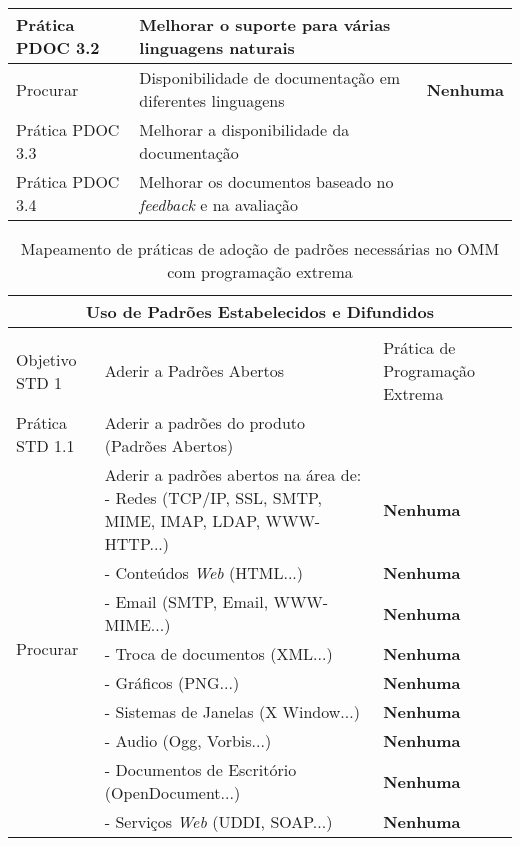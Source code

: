 \begin{longtable}{|p{2cm}|p{7cm}|p{7cm}|}
  \hline \cellcolor[gray]{0.9} Prática PDOC 3.2 &
  \cellcolor[gray]{0.9}
  Melhorar o suporte para várias linguagens naturais & \\
  \hline \multirow{1}{*}{Procurar} & Disponibilidade de documentação
  em diferentes linguagens &
  \textbf{Nenhuma} \\
  \hline \cellcolor[gray]{0.9} Prática PDOC 3.3 &
  \cellcolor[gray]{0.9}
  Melhorar a disponibilidade da documentação & \\
  \hline \cellcolor[gray]{0.9} Prática PDOC 3.4 &
  \cellcolor[gray]{0.9} Melhorar os documentos baseado no
  \textit{feedback} e na avaliação
  &   \label{tab:xp-to-omm} \\
  \hline
\end{longtable}

\begin{longtable}{|p{2cm}|p{7cm}|p{7cm}|}
  \caption{Mapeamento de práticas de adoção de padrões necessárias no
    OMM com
    programação extrema} \\
  \multicolumn{3}{|c|}{\cellcolor[gray]{0.6} Uso de Padrões
    Estabelecidos e Difundidos}\\
  \endhead
  & & \\
  \hline \cellcolor[gray]{0.6} Objetivo STD 1 & \cellcolor[gray]{0.6}
  Aderir a Padrões Abertos & Prática de Programação Extrema \\
  \hline \cellcolor[gray]{0.9} Prática STD 1.1 & \cellcolor[gray]{0.9}
  Aderir a padrões do produto (Padrões Abertos) & \\
  \hline \multirow{9}{*}{Procurar} & Aderir a padrões abertos na área
  de: - Redes (TCP/IP, SSL, SMTP, MIME, IMAP, LDAP, WWW-HTTP...) &\textbf{Nenhuma} \\
  \cline{2-3} & - Conteúdos \textit{Web} (HTML...) &\textbf{Nenhuma} \\
  \cline{2-3} & - Email (SMTP, Email, WWW-MIME...) &\textbf{Nenhuma}
  \\
  \cline{2-3} & - Troca de documentos (XML...) &\textbf{Nenhuma} \\
  \cline{2-3} & - Gráficos (PNG...) &\textbf{Nenhuma} \\
  \cline{2-3} & - Sistemas de Janelas (X Window...) &\textbf{Nenhuma}
  \\
  \cline{2-3} & - Audio (Ogg, Vorbis...) &\textbf{Nenhuma} \\
  \cline{2-3} & - Documentos de Escritório (OpenDocument...)
  &\textbf{Nenhuma} \\
  \cline{2-3} & - Serviços \textit{Web} (UDDI, SOAP...) &\textbf{Nenhuma} \\

\end{longtable}

